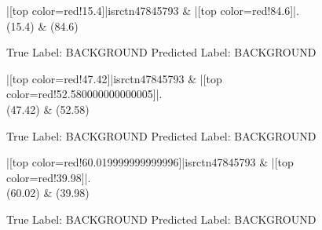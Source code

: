\documentclass[a4paper, landscape]{article}
\begin{document}
\clearpage
\begin{figure}
\begin{center}
\begin{dependency}
\begin{deptext}
|[top color=red!15.4]|isrctn47845793 \& |[top color=red!84.6]|.\\
(15.4) \& (84.6)\\
\end{deptext}
\end{dependency}
\end{center}
\caption{True Label: BACKGROUND Predicted Label: BACKGROUND}
\end{figure}
\clearpage
\begin{figure}
\begin{center}
\begin{dependency}
\begin{deptext}
|[top color=red!47.42]|isrctn47845793 \& |[top color=red!52.580000000000005]|.\\
(47.42) \& (52.58)\\
\end{deptext}
\end{dependency}
\end{center}
\caption{True Label: BACKGROUND Predicted Label: BACKGROUND}
\end{figure}
\clearpage
\begin{figure}
\begin{center}
\begin{dependency}
\begin{deptext}
|[top color=red!60.019999999999996]|isrctn47845793 \& |[top color=red!39.98]|.\\
(60.02) \& (39.98)\\
\end{deptext}
\end{dependency}
\end{center}
\caption{True Label: BACKGROUND Predicted Label: BACKGROUND}
\end{figure}
\clearpage
\end{document}
